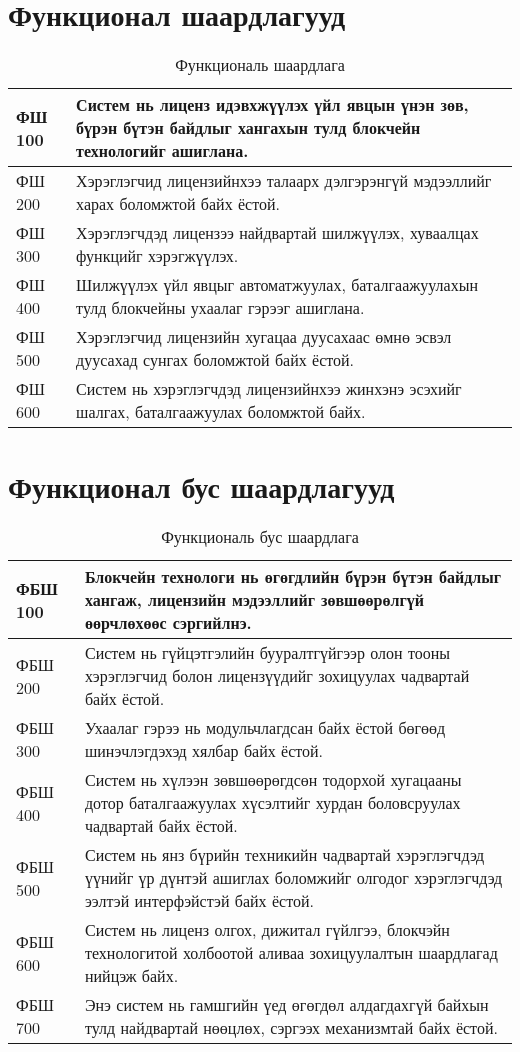 \section{Функционал шаардлагууд}
\begin{table}[h!]
	\centering
	\begin{tabular}{ |p{2cm}|p{13cm}| }
      \hline
      ФШ 100 & Систем нь лиценз идэвхжүүлэх үйл явцын үнэн зөв, бүрэн бүтэн байдлыг хангахын тулд блокчейн технологийг ашиглана.
      \\ \hline
      ФШ 200 & Хэрэглэгчид  лицензийнхээ талаарх дэлгэрэнгүй мэдээллийг харах боломжтой байх ёстой.
      \\ \hline
      ФШ 300 & Хэрэглэгчдэд лицензээ найдвартай шилжүүлэх, хуваалцах функцийг хэрэгжүүлэх.
      \\ \hline
      ФШ 400 & Шилжүүлэх үйл явцыг автоматжуулах, баталгаажуулахын тулд блокчейны ухаалаг гэрээг ашиглана.
      \\ \hline
      ФШ 500 & Хэрэглэгчид лицензийн хугацаа дуусахаас өмнө эсвэл дуусахад сунгах боломжтой байх ёстой.
      \\ \hline
      ФШ 600 & Систем нь хэрэглэгчдэд лицензийнхээ жинхэнэ эсэхийг шалгах, баталгаажуулах боломжтой байх.
      \\ \hline
	\end{tabular}
   \caption{Функциональ шаардлага}
\end{table}

\newpage
\section{Функционал бус шаардлагууд}
\begin{table}[h!]
	\centering
	\begin{tabular}{ |p{2cm}|p{13cm}| }
		\hline
		ФБШ 100 & Блокчейн технологи нь өгөгдлийн бүрэн бүтэн байдлыг хангаж, лицензийн мэдээллийг зөвшөөрөлгүй өөрчлөхөөс сэргийлнэ.
      \\ \hline
		ФБШ 200 & Систем нь гүйцэтгэлийн бууралтгүйгээр олон тооны хэрэглэгчид болон лицензүүдийг зохицуулах чадвартай байх ёстой.
      \\ \hline
		ФБШ 300 & Ухаалаг гэрээ нь модульчлагдсан байх ёстой бөгөөд шинэчлэгдэхэд хялбар байх ёстой.
      \\ \hline
		ФБШ 400 & Систем нь хүлээн зөвшөөрөгдсөн тодорхой хугацааны дотор баталгаажуулах хүсэлтийг хурдан боловсруулах чадвартай байх ёстой.
      \\ \hline
		ФБШ 500 & Систем нь янз бүрийн техникийн чадвартай хэрэглэгчдэд үүнийг үр дүнтэй ашиглах боломжийг олгодог хэрэглэгчдэд ээлтэй интерфэйстэй байх ёстой.
      \\ \hline
		ФБШ 600 & Систем нь лиценз олгох, дижитал гүйлгээ, блокчэйн технологитой холбоотой аливаа зохицуулалтын шаардлагад нийцэж байх.
      \\  \hline
      ФБШ 700 & Энэ систем нь гамшгийн үед өгөгдөл алдагдахгүй байхын тулд найдвартай нөөцлөх, сэргээх механизмтай байх ёстой.
      \\ \hline
	\end{tabular}
   \caption{Функциональ бус шаардлага}
\end{table}

